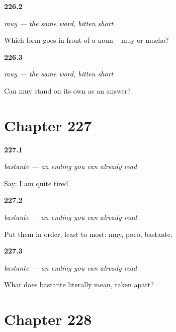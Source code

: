 \noindent\begin{minipage}[t]{\linewidth}
\raggedright
\hypertarget{review-ES-C60-muy-which}{\textbf{226.2}} \emph{muy — the same word, bitten short}\par
\small Which form goes in front of a noun -- muy or mucho?
\end{minipage}\par\medskip

\noindent\begin{minipage}[t]{\linewidth}
\raggedright
\hypertarget{review-ES-C60-muy-alone}{\textbf{226.3}} \emph{muy — the same word, bitten short}\par
\small Can muy stand on its own as an answer?
\end{minipage}\par\medskip

\section*{Chapter 227}

\noindent\begin{minipage}[t]{\linewidth}
\raggedright
\hypertarget{review-ES-C60-bastante-say}{\textbf{227.1}} \emph{bastante — an ending you can already read}\par
\small Say: I am quite tired.
\end{minipage}\par\medskip

\noindent\begin{minipage}[t]{\linewidth}
\raggedright
\hypertarget{review-ES-C60-bastante-scale}{\textbf{227.2}} \emph{bastante — an ending you can already read}\par
\small Put them in order, least to most: muy, poco, bastante.
\end{minipage}\par\medskip

\noindent\begin{minipage}[t]{\linewidth}
\raggedright
\hypertarget{review-ES-C60-bastante-parts}{\textbf{227.3}} \emph{bastante — an ending you can already read}\par
\small What does bastante literally mean, taken apart?
\end{minipage}\par\medskip

\section*{Chapter 228}

